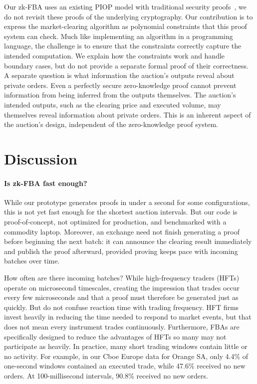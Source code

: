Our zk-FBA uses an existing PIOP model with traditional security proofs~\cite{GWC19,Sef24,Lip25}, we do not revisit these proofs of the underlying cryptography.  Our contribution is to express the market-clearing algorithm as polynomial constraints that this proof system can check. Much like implementing an algorithm in a programming language, the challenge is to ensure that the constraints correctly capture the intended computation. We explain how the constraints work and handle boundary cases, but do not provide a separate formal proof of their correctness. A separate question is what information the auction's outputs reveal about private orders. Even a perfectly secure zero-knowledge proof cannot prevent information from being inferred from the outputs themselves. The auction's intended outputs, such as the clearing price and executed volume, may themselves reveal information about private orders. This is an inherent aspect of the auction's design, independent of the zero-knowledge proof system.



\section{Discussion}

\paragraph{Is zk-FBA fast enough?} While our prototype generates proofs in under a second for some configurations, this is not yet fast enough for the shortest auction intervals. But our code is proof-of-concept, not optimized for production, and benchmarked with a commodity laptop. Moreover, an exchange need not finish generating a proof before beginning the next batch: it can announce the clearing result immediately and publish the proof afterward, provided proving keeps pace with incoming batches over time.

How often are there incoming batches? While high-frequency traders (HFTs) operate on microsecond timescales, creating the impression that trades occur every few microseconds and that a proof must therefore be generated just as quickly. But do not confuse reaction time with trading frequency. HFT firms invest heavily in reducing the time needed to respond to market events, but that does not mean every instrument trades continuously. Furthermore, FBAs are specifically designed to reduce the advantages of HFTs so many may not participate as heavily. In practice, many short trading windows contain little or no activity. For example, in our Cboe Europe data for Orange SA, only 4.4\% of one-second windows contained an executed trade, while 47.6\% received no new orders. At 100-millisecond intervals, 90.8\% received no new orders. 

